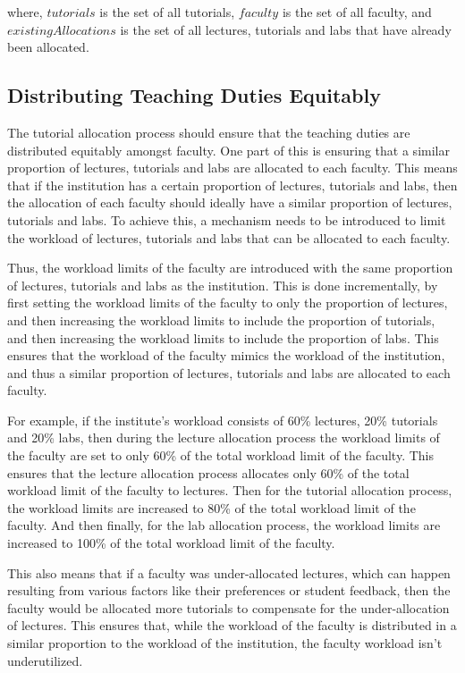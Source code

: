 where, $tutorials$ is the set of all tutorials, $faculty$ is the set of all faculty, and $existingAllocations$ is the set of all lectures, tutorials and labs that have already been allocated.

\subsection{Distributing Teaching Duties Equitably}
\label{sec:workload_limits}

The tutorial allocation process should ensure that the teaching duties are distributed equitably amongst faculty. One part of this is ensuring that a similar proportion of lectures, tutorials and labs are allocated to each faculty. This means that if the institution has a certain proportion of lectures, tutorials and labs, then the allocation of each faculty should ideally have a similar proportion of lectures, tutorials and labs. To achieve this, a mechanism needs to be introduced to limit the workload of lectures, tutorials and labs that can be allocated to each faculty.

Thus, the workload limits of the faculty are introduced with the same proportion of lectures, tutorials and labs as the institution. This is done incrementally, by first setting the workload limits of the faculty to only the proportion of lectures, and then increasing the workload limits to include the proportion of tutorials, and then increasing the workload limits to include the proportion of labs. This ensures that the workload of the faculty mimics the workload of the institution, and thus a similar proportion of lectures, tutorials and labs are allocated to each faculty.

For example, if the institute's workload consists of 60\% lectures, 20\% tutorials and 20\% labs, then during the lecture allocation process the workload limits of the faculty are set to only 60\% of the total workload limit of the faculty. This ensures that the lecture allocation process allocates only 60\% of the total workload limit of the faculty to lectures. Then for the tutorial allocation process, the workload limits are increased to 80\% of the total workload limit of the faculty. And then finally, for the lab allocation process, the workload limits are increased to 100\% of the total workload limit of the faculty.

This also means that if a faculty was under-allocated lectures, which can happen resulting from various factors like their preferences or student feedback, then the faculty would be allocated more tutorials to compensate for the under-allocation of lectures. This ensures that, while the workload of the faculty is distributed in a similar proportion to the workload of the institution, the faculty workload isn't underutilized.

